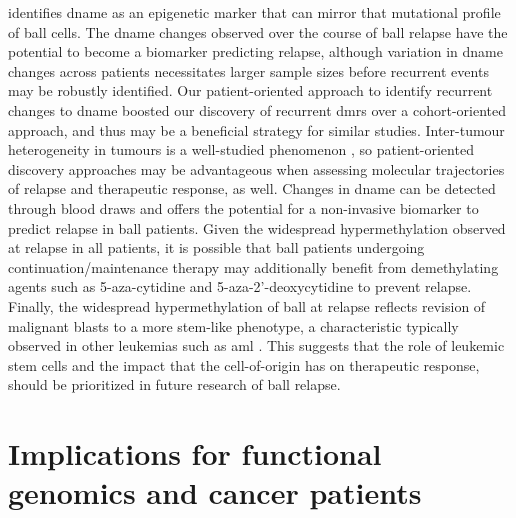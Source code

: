  identifies \gls{dname} as an epigenetic marker that can mirror that mutational profile of \gls{ball} cells.
The \gls{dname} changes observed over the course of \gls{ball} relapse have the potential to become a biomarker predicting relapse, although variation in \gls{dname} changes across patients necessitates larger sample sizes before recurrent events may be robustly identified.
Our patient-oriented approach to identify recurrent changes to \gls{dname} boosted our discovery of recurrent \glspl{dmr} over a cohort-oriented approach, and thus may be a beneficial strategy for similar studies.
Inter-tumour heterogeneity in tumours is a well-studied phenomenon \cite{marusykTumorHeterogeneityCauses2010,sottorivaCatchMyDrift2017,huangGeneticNongeneticInstability2013,mcgranahanBiologicalTherapeuticImpact2015,landauChronicLymphocyticLeukemia2013,ben-davidGeneticTranscriptionalEvolution2018,carterEpigeneticBasisCellular2021}, so patient-oriented discovery approaches may be advantageous when assessing molecular trajectories of relapse and therapeutic response, as well.
Changes in \gls{dname} can be detected through blood draws \cite{peterDynamicsCellfreeDNA2020,shenSensitiveTumourDetection2018,nassiriDetectionDiscriminationIntracranial2020} and offers the potential for a non-invasive biomarker to predict relapse in \gls{ball} patients.
Given the widespread hypermethylation observed at relapse in all patients, it is possible that \gls{ball} patients undergoing continuation/maintenance therapy may additionally benefit from demethylating agents such as 5-aza-cytidine and 5-aza-2'-deoxycytidine to prevent relapse.
Finally, the widespread hypermethylation of \gls{ball} at relapse reflects revision of malignant blasts to a more stem-like phenotype, a characteristic typically observed in other leukemias such as \gls{aml} \cite{krivtsovMLLTranslocationsHistone2007,liClinicalImplicationsGenomewide2017,kresoEvolutionCancerStem2014,shlushIdentificationPreleukaemicHaematopoietic2014,shlushTracingOriginsRelapse2017}.
This suggests that the role of leukemic stem cells and the impact that the cell-of-origin has on therapeutic response, should be prioritized in future research of \gls{ball} relapse.

\section{Implications for functional genomics and cancer patients}

